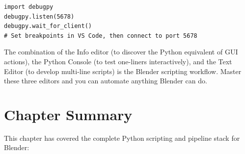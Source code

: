 \begin{lstlisting}
import debugpy
debugpy.listen(5678)
debugpy.wait_for_client()
# Set breakpoints in VS Code, then connect to port 5678
\end{lstlisting}

\begin{tipbox}
The combination of the Info editor (to discover the Python equivalent of GUI actions), the Python Console (to test one-liners interactively), and the Text Editor (to develop multi-line scripts) is the Blender scripting workflow. Master these three editors and you can automate anything Blender can do.
\end{tipbox}


\section{Chapter Summary}
\label{sec:scripting-summary}

This chapter has covered the complete Python scripting and pipeline stack for Blender:

